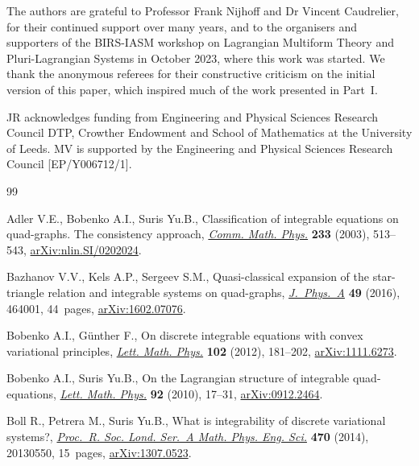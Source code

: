 \documentclass[pdftex]{sigma}
\numberwithin{equation}{section}
\begin{document}
The authors are grateful to Professor Frank Nijhoff and Dr Vincent Caudrelier, for their continued support over many years, and to the organisers and supporters of the BIRS-IASM workshop on Lagrangian Multiform Theory and Pluri-Lagrangian Systems in October 2023, where this work was started. We thank the anonymous referees for their constructive criticism on the initial version of this paper, which inspired much of the work presented in Part~I.

JR acknowledges funding from Engineering and Physical Sciences Research Council DTP, Crowther Endowment and School of Mathematics at the University of Leeds. MV is supported by the Engineering and Physical Sciences Research Council [EP/Y006712/1].

\begin{thebibliography}{99}
\footnotesize\itemsep=0pt

Adler V.E., Bobenko A.I., Suris Yu.B., Classification of integrable equations on
 quad-graphs. {T}he consistency approach,
 \href{https://doi.org/10.1007/s00220-002-0762-8}{\textit{Comm. Math. Phys.}}
 \textbf{233} (2003), 513--543,
 \href{http://arxiv.org/abs/nlin.SI/0202024}{arXiv:nlin.SI/0202024}.

Bazhanov V.V., Kels A.P., Sergeev S.M., Quasi-classical expansion of the
 star-triangle relation and integrable systems on quad-graphs,
 \href{https://doi.org/10.1088/1751-8113/49/46/464001}{\textit{J.~Phys.~A}}
 \textbf{49} (2016), 464001, 44~pages,
 \href{http://arxiv.org/abs/1602.07076}{arXiv:1602.07076}.

Bobenko A.I., G\"unther F., On discrete integrable equations with convex
 variational principles,
 \href{https://doi.org/10.1007/s11005-012-0583-4}{\textit{Lett. Math. Phys.}}
 \textbf{102} (2012), 181--202,
 \href{http://arxiv.org/abs/1111.6273}{arXiv:1111.6273}.

Bobenko A.I., Suris Yu.B., On the {L}agrangian structure of integrable
 quad-equations,
 \href{https://doi.org/10.1007/s11005-010-0381-9}{\textit{Lett. Math. Phys.}}
 \textbf{92} (2010), 17--31,
 \href{http://arxiv.org/abs/0912.2464}{arXiv:0912.2464}.

Boll R., Petrera M., Suris Yu.B., What is integrability of discrete variational
 systems?, \href{https://doi.org/10.1098/rspa.2013.0550}{\textit{Proc.~R. Soc.
 Lond. Ser.~A Math. Phys. Eng. Sci.}} \textbf{470} (2014), 20130550, 15~pages,
 \href{http://arxiv.org/abs/1307.0523}{arXiv:1307.0523}.


\end{thebibliography}
\end{document}
